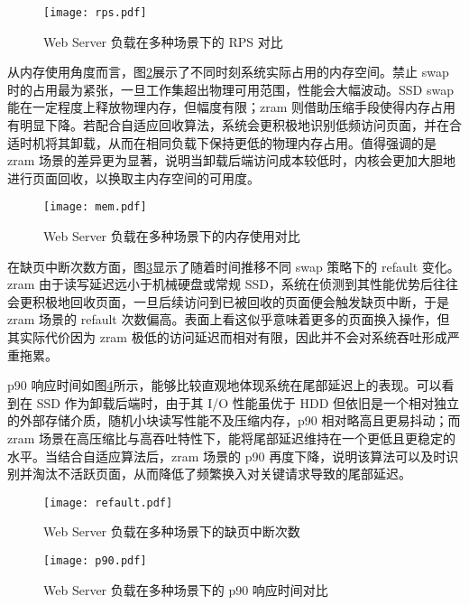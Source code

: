 \begin{figure}[htbp]
    \centering
    \texttt{[image: rps.pdf]}
    \caption{Web Server 负载在多种场景下的 RPS 对比}
    \label{fig:rps}
\end{figure}

从内存使用角度而言，图\ref{fig:mem}展示了不同时刻系统实际占用的内存空间。禁止  swap  时的占用最为紧张，一旦工作集超出物理可用范围，性能会大幅波动。SSD  swap  能在一定程度上释放物理内存，但幅度有限；zram 则借助压缩手段使得内存占用有明显下降。若配合自适应回收算法，系统会更积极地识别低频访问页面，并在合适时机将其卸载，从而在相同负载下保持更低的物理内存占用。值得强调的是 zram 场景的差异更为显著，说明当卸载后端访问成本较低时，内核会更加大胆地进行页面回收，以换取主内存空间的可用度。

\begin{figure}[htbp]
    \centering
    \texttt{[image: mem.pdf]}
    \caption{Web Server 负载在多种场景下的内存使用对比}
    \label{fig:mem}
\end{figure}

在缺页中断次数方面，图\ref{fig:refault}显示了随着时间推移不同  swap  策略下的 refault 变化。zram 由于读写延迟远小于机械硬盘或常规 SSD，系统在侦测到其性能优势后往往会更积极地回收页面，一旦后续访问到已被回收的页面便会触发缺页中断，于是 zram 场景的 refault 次数偏高。表面上看这似乎意味着更多的页面换入操作，但其实际代价因为 zram 极低的访问延迟而相对有限，因此并不会对系统吞吐形成严重拖累。

p90 响应时间如图\ref{fig:p90}所示，能够比较直观地体现系统在尾部延迟上的表现。可以看到在 SSD 作为卸载后端时，由于其 I/O 性能虽优于 HDD 但依旧是一个相对独立的外部存储介质，随机小块读写性能不及压缩内存，p90 相对略高且更易抖动；而 zram 场景在高压缩比与高吞吐特性下，能将尾部延迟维持在一个更低且更稳定的水平。当结合自适应算法后，zram 场景的 p90 再度下降，说明该算法可以及时识别并淘汰不活跃页面，从而降低了频繁换入对关键请求导致的尾部延迟。

\begin{figure}[htbp]
    \centering
    \texttt{[image: refault.pdf]}
    \caption{Web Server 负载在多种场景下的缺页中断次数}
    \label{fig:refault}
\end{figure}



\begin{figure}[htbp]
    \centering
    \texttt{[image: p90.pdf]}
    \caption{Web Server 负载在多种场景下的 p90 响应时间对比}
    \label{fig:p90}
\end{figure}

